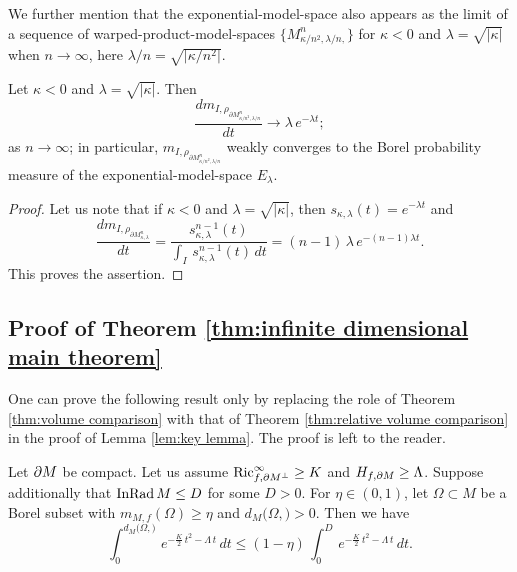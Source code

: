 We further mention that
the exponential-model-space also appears as the limit of a sequence of warped-product-model-spaces $\{M^{n}_{\kappa/n^{2},\lambda/n,}\}$ for $\kappa<0$ and $\lambda=\sqrt{\vert \kappa \vert}$
when $n\to \infty$,
here $\lambda/n=\sqrt{\vert \kappa/n^{2} \vert}$.
\begin{prop}\label{prop:exponential distribution laws}
Let $\kappa<0$ and $\lambda=\sqrt{\vert \kappa \vert}$.
Then
\begin{equation*}
\frac{d   m_{I,\rho_{  \partial M^{n}_{\kappa/n^{2},\lambda/n}   }} }{dt} \to \lambda\, e^{-\lambda t};
\end{equation*}
as $n\to \infty$;
in particular,
$m_{I,\rho_{ \partial M^{n}_{\kappa/n^{2},\lambda/n}   }}$ weakly converges to the Borel probability measure of the exponential-model-space $E_{\lambda}$.
\end{prop}
\begin{proof}
Let us note that
if $\kappa<0$ and $\lambda=\sqrt{\vert \kappa \vert}$,
then $s_{\kappa,\lambda}(t)=e^{-\lambda t}$
and 
\begin{equation*}
\frac{d m_{I,\rho_{ \partial M^{n}_{\kappa,\lambda}    }}    }{dt}=\frac{s^{n-1}_{\kappa,\lambda}(t)}{\int_{I}\,s^{n-1}_{\kappa,\lambda}(t)\,dt          }=(n-1)\,\lambda\,e^{-(n-1)\lambda t}.
\end{equation*}
This proves the assertion.
\end{proof}

\subsection{Proof of Theorem \ref{thm:infinite dimensional main theorem}}\label{sec:Observable inscribed radius comparisons}
One can prove the following result only by replacing the role of Theorem \ref{thm:volume comparison} with that of Theorem \ref{thm:relative volume comparison} in the proof of Lemma \ref{lem:key lemma}.
The proof is left to the reader.
\begin{lem}\label{lem:infinite dimensional key lemma}
Let $\partial M$ be compact.
Let us assume $\operatorname{Ric}^{\infty}_{f,\partial M^{\perp}}\geq K$ and $H_{f,\partial M} \geq \Lambda$.
Suppose additionally that
$\operatorname{InRad} M\leq D$ for some $D>0$.
For $\eta \in (0,1)$,
let $\Omega \subset M$ be a Borel subset with $m_{M,f}(\Omega)\geq \eta$ and $d_{M}(\Omega,\bm)>0$.
Then we have
\begin{equation*}
\int^{d_{M}(\Omega,\bm)}_{0}\,e^{-\frac{K}{2}\,t^{2}-\Lambda\,t} \,dt \leq (1-\eta)\,  \int^{D}_{0}\,e^{-\frac{K}{2}\,t^{2}-\Lambda\,t} \,dt.
\end{equation*} 
\end{lem}

